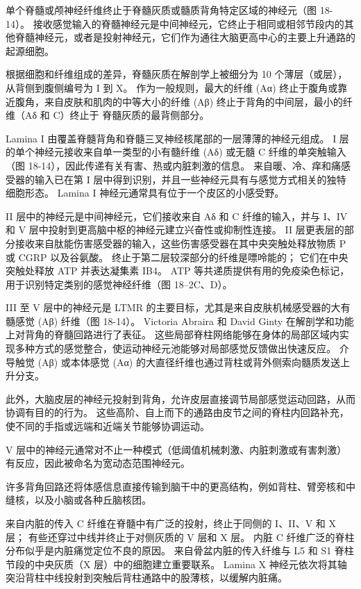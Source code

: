 单个脊髓或颅神经纤维终止于脊髓灰质或髓质背角特定区域的神经元（图 18-14）。 接收感觉输入的脊髓神经元是中间神经元，它终止于相同或相邻节段内的其他脊髓神经元，或者是投射神经元，它们作为通往大脑更高中心的主要上升通路的起源细胞。

根据细胞和纤维组成的差异，脊髓灰质在解剖学上被细分为 10 个薄层（或层），从背侧到腹侧编号为 I 到 X。 作为一般规则，最大的纤维 (Aα) 终止于腹角或靠近腹角，来自皮肤和肌肉的中等大小的纤维 (Aβ) 终止于背角的中间层，最小的纤维（Aδ 和 C）终止于 脊髓灰质的最背侧部分。

Lamina I 由覆盖脊髓背角和脊髓三叉神经核尾部的一层薄薄的神经元组成。 I 层的单个神经元接收来自单一类型的小有髓纤维 (Aδ) 或无髓 C 纤维的单突触输入（图 18-14），因此传递有关有害、热或内脏刺激的信息。 来自暖、冷、痒和痛感受器的输入已在第 I 层中得到识别，并且一些神经元具有与感觉方式相关的独特细胞形态。 Lamina I 神经元通常具有位于一个皮区的小感受野。

II 层中的神经元是中间神经元，它们接收来自 Aδ 和 C 纤维的输入，并与 I、IV 和 V 层中投射到更高脑中枢的神经元建立兴奋性或抑制性连接。 II 层更表层的部分接收来自肽能伤害感受器的输入，这些伤害感受器在其中央突触处释放物质 P 或 CGRP 以及谷氨酸。 终止于第二层较深部分的纤维是嘌呤能的； 它们在中央突触处释放 ATP 并表达凝集素 IB4。 ATP 等共递质提供有用的免疫染色标记，用于识别特定类别的感觉神经纤维（图 18–2C、D）。

III 至 V 层中的神经元是 LTMR 的主要目标，尤其是来自皮肤机械感受器的大有髓感觉 (Aβ) 纤维（图 18-14）。 Victoria Abraira 和 David Ginty 在解剖学和功能上对背角的脊髓回路进行了表征。 这些局部脊柱网络能够在身体的局部区域内实现多种方式的感觉整合，使运动神经元池能够对局部感觉反馈做出快速反应。 介导触觉 (Aβ) 或本体感觉 (Aα) 的大直径纤维也通过背柱或背外侧索向髓质发送上升分支。

此外，大脑皮层的神经元投射到背角，允许皮层直接调节局部感觉运动回路，从而协调有目的的行为。 这些高阶、自上而下的通路由皮节之间的脊柱内回路补充，使不同的手指或远端和近端关节能够协调运动。

V 层中的神经元通常对不止一种模式（低阈值机械刺激、内脏刺激或有害刺激）有反应，因此被命名为宽动态范围神经元。

许多背角回路还将体感信息直接传输到脑干中的更高结构，例如背柱、臂旁核和中缝核，以及小脑或各种丘脑核团。

来自内脏的传入 C 纤维在脊髓中有广泛的投射，终止于同侧的 I、II、V 和 X 层； 有些还穿过中线并终止于对侧灰质的 V 层和 X 层。 内脏 C 纤维广泛的脊柱分布似乎是内脏痛觉定位不良的原因。 来自骨盆内脏的传入纤维与 L5 和 S1 脊柱节段的中央灰质（X 层）中的细胞建立重要联系。 Lamina X 神经元依次将其轴突沿背柱中线投射到突触后背柱通路中的股薄核，以缓解内脏痛。

